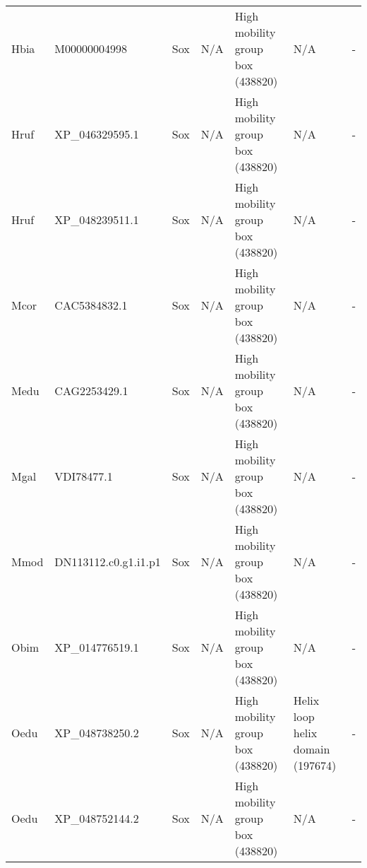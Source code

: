 \documentclass[../main.tex]{subfiles}
\begin{document}
\begin{landscape}
\begin{longtable}{lllllll}
		Hbia           & M00000004998          & Sox            & N/A                 & High mobility group box (438820)            & N/A                                                                    & -                    \\
		Hruf           & XP\_046329595.1       & Sox            & N/A                 & High mobility group box (438820)            & N/A                                                                    & -                    \\
		Hruf           & XP\_048239511.1       & Sox            & N/A                 & High mobility group box (438820)            & N/A                                                                    & -                    \\
		Mcor           & CAC5384832.1          & Sox            & N/A                 & High mobility group box (438820)            & N/A                                                                    & -                    \\
		Medu           & CAG2253429.1          & Sox            & N/A                 & High mobility group box (438820)            & N/A                                                                    & -                    \\
		Mgal           & VDI78477.1            & Sox            & N/A                 & High mobility group box (438820)            & N/A                                                                    & -                    \\
		Mmod           & DN113112.c0.g1.i1.p1  & Sox            & N/A                 & High mobility group box (438820)            & N/A                                                                    & -                    \\
		Obim           & XP\_014776519.1       & Sox            & N/A                 & High mobility group box (438820)            & N/A                                                                    & -                    \\
		Oedu           & XP\_048738250.2       & Sox            & N/A                 & High mobility group box (438820)            & Helix loop helix domain (197674)                                       & -                    \\
		Oedu           & XP\_048752144.2       & Sox            & N/A                 & High mobility group box (438820)            & N/A                                                                    & -                    \\

\end{longtable}
\end{landscape}
\end{document}
